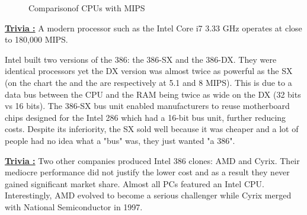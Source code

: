 \documentclass[book.tex]{subfiles}
\begin{document}
\begin{figure}[H]
\centering
   \caption{Comparison\protect\footnotemark of CPUs with MIPS}
 \end{figure}
 \par
 \par
  \textbf{\underline{Trivia :}} A modern processor such as the Intel Core i7 3.33 GHz operates at close to 180,000 MIPS.\\
  \par
 Intel built two versions of the 386: the 386-SX and the 386-DX. They were identical processors yet the DX version was almost twice as powerful as the SX (on the chart the  and the  are respectively at 5.1 and 8 MIPS). This is due to a data bus between the CPU and the RAM being twice as wide on the DX (32 bits vs 16 bits). The 386-SX bus unit enabled manufacturers to reuse motherboard chips designed for the Intel 286 which had a 16-bit bus unit, further reducing costs. Despite its inferiority, the SX sold well because it was cheaper and a lot of people had no idea what a "bus" was, they just wanted "a 386".\\



 \par
\textbf{\underline{Trivia :}} Two other companies produced Intel 386 clones: AMD and Cyrix. Their mediocre performance did not justify the lower cost and as a result they never gained significant market share. Almost all PCs featured an Intel CPU. Interestingly, AMD evolved to become a serious challenger while Cyrix merged with National Semiconductor in 1997.\\
\par
\end{document}
